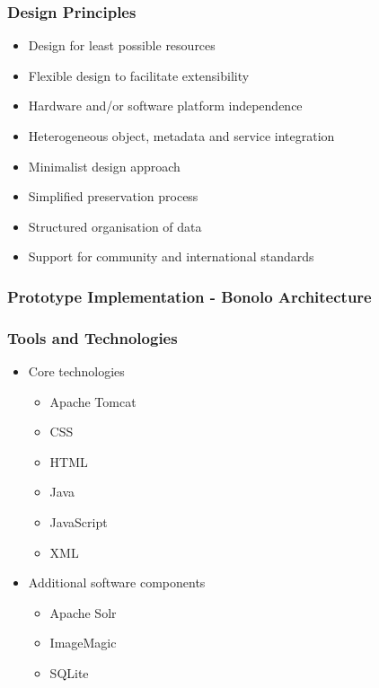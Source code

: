 \documentclass[xcolor=dvitex,t,11pt]{beamer}
\begin{document}
\begin{frame}[fragile]
\frametitle{Design Principles}
\begin{itemize}
\item<1-> Design for least possible resources
\item<2-> Flexible design to facilitate extensibility
\item<3-> Hardware and/or software platform independence
\item<4-> Heterogeneous object, metadata and service integration
\item<5-> Minimalist design approach
\item<6-> Simplified preservation process
\item<7-> Structured organisation of data
\item<8-> Support for community and international standards
\end{itemize}

\end{frame}


\begin{frame}[fragile]
\frametitle{Prototype Implementation - Bonolo Architecture}
\begin{figure}
\centering
\framebox[\textwidth]{%

}
\end{figure}
\end{frame}

\begin{frame}[fragile]
\frametitle{Tools and Technologies}
\begin{itemize}
\item<1-> Core technologies
\begin{itemize}
\item<2-> Apache Tomcat
\item<3-> CSS
\item<4-> HTML
\item<5-> Java
\item<6-> JavaScript
\item<7-> XML
\end{itemize}
\item<8-> Additional software components
\begin{itemize}
\item<9-> Apache Solr
\item<10-> ImageMagic
\item<11-> SQLite
\end{itemize}
\end{itemize}
\end{frame}
\end{document}
